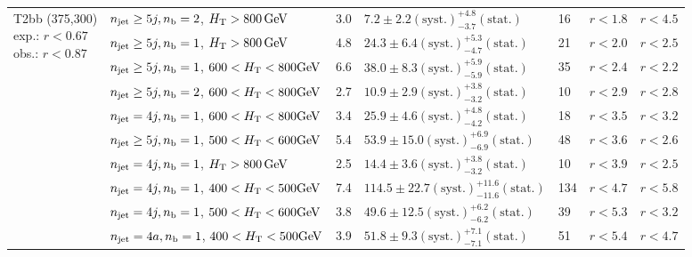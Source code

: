 \begin{table}[h!]
\begin{tabular}{ lllllll }
\multirow{10}{*}{\parbox[t]{2cm}{T2bb (375,300)\\exp.: $r<0.67$\\obs.: $r<0.87$}}
 & $n_{\mathrm{jet}} \geq5j,n_{\text{b}} =2$, $\mbox{$H_\text{T}$} > 800 \, \mathrm{GeV}$ & 3.0 & $7.2 \pm 2.2 \mathrm{(syst.)} ^{+4.8}_{-3.7} \mathrm{(stat.)}$ & 16 & $r < 1.8$ & $r < 4.5$\\ 
 & $n_{\mathrm{jet}} \geq5j,n_{\text{b}} =1$, $\mbox{$H_\text{T}$} > 800 \, \mathrm{GeV}$ & 4.8 & $24.3 \pm 6.4 \mathrm{(syst.)} ^{+5.3}_{-4.7} \mathrm{(stat.)}$ & 21 & $r < 2.0$ & $r < 2.5$\\ 
 & $n_{\mathrm{jet}} \geq5j,n_{\text{b}} =1$, $600 < \mbox{$H_\text{T}$} < 800 \mathrm{GeV}$ & 6.6 & $38.0 \pm 8.3 \mathrm{(syst.)} ^{+5.9}_{-5.9} \mathrm{(stat.)}$ & 35 & $r < 2.4$ & $r < 2.2$\\ 
 & $n_{\mathrm{jet}} \geq5j,n_{\text{b}} =2$, $600 < \mbox{$H_\text{T}$} < 800 \mathrm{GeV}$ & 2.7 & $10.9 \pm 2.9 \mathrm{(syst.)} ^{+3.8}_{-3.2} \mathrm{(stat.)}$ & 10 & $r < 2.9$ & $r < 2.8$\\ 
 & $n_{\mathrm{jet}} =4j,n_{\text{b}} =1$, $600 < \mbox{$H_\text{T}$} < 800 \mathrm{GeV}$ & 3.4 & $25.9 \pm 4.6 \mathrm{(syst.)} ^{+4.8}_{-4.2} \mathrm{(stat.)}$ & 18 & $r < 3.5$ & $r < 3.2$\\ 
 & $n_{\mathrm{jet}} \geq5j,n_{\text{b}} =1$, $500 < \mbox{$H_\text{T}$} < 600 \mathrm{GeV}$ & 5.4 & $53.9 \pm 15.0 \mathrm{(syst.)} ^{+6.9}_{-6.9} \mathrm{(stat.)}$ & 48 & $r < 3.6$ & $r < 2.6$\\ 
 & $n_{\mathrm{jet}} =4j,n_{\text{b}} =1$, $\mbox{$H_\text{T}$} > 800 \, \mathrm{GeV}$ & 2.5 & $14.4 \pm 3.6 \mathrm{(syst.)} ^{+3.8}_{-3.2} \mathrm{(stat.)}$ & 10 & $r < 3.9$ & $r < 2.5$\\ 
 & $n_{\mathrm{jet}} =4j,n_{\text{b}} =1$, $400 < \mbox{$H_\text{T}$} < 500 \mathrm{GeV}$ & 7.4 & $114.5 \pm 22.7 \mathrm{(syst.)} ^{+11.6}_{-11.6} \mathrm{(stat.)}$ & 134 & $r < 4.7$ & $r < 5.8$\\ 
 & $n_{\mathrm{jet}} =4j,n_{\text{b}} =1$, $500 < \mbox{$H_\text{T}$} < 600 \mathrm{GeV}$ & 3.8 & $49.6 \pm 12.5 \mathrm{(syst.)} ^{+6.2}_{-6.2} \mathrm{(stat.)}$ & 39 & $r < 5.3$ & $r < 3.2$\\ 
 & $n_{\mathrm{jet}} =4a,n_{\text{b}} =1$, $400 < \mbox{$H_\text{T}$} < 500 \mathrm{GeV}$ & 3.9 & $51.8 \pm 9.3 \mathrm{(syst.)} ^{+7.1}_{-7.1} \mathrm{(stat.)}$ & 51 & $r < 5.4$ & $r < 4.7$\\ \hline
    \hline
  \end{tabular}
\end{table}

